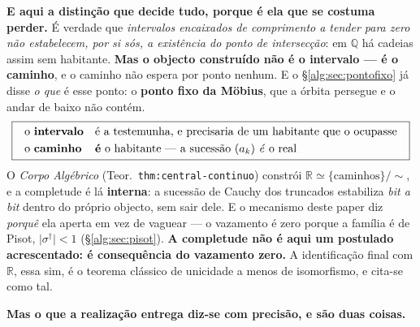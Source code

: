 \documentclass[11pt,a4paper]{article}
\newcommand{\code}[1]{\texttt{\small #1}}
\newcommand{\dg}{^{\dagger}}
\newcommand{\abs}[1]{\lvert #1\rvert}
\begin{document}
\medskip
\noindent\textbf{E aqui a distinção que decide tudo, porque é ela que se costuma
perder.} É verdade que \emph{intervalos encaixados de comprimento a tender para
zero não estabelecem, por si sós, a existência do ponto de intersecção}: em
$\mathbb{Q}$ há cadeias assim sem habitante. \textbf{Mas o objecto construído não é
o intervalo --- é o caminho}, e o caminho não espera por ponto nenhum. E o
\S\ref{alg:sec:pontofixo} já disse \emph{o que} é esse ponto: o \textbf{ponto fixo da
Möbius}, que a órbita persegue e o andar de baixo não contém.
\[
\boxed{\;\begin{array}{ll}
\text{o \textbf{intervalo}} & \text{é a testemunha, e precisaria de um habitante que
o ocupasse}\\[3pt]
\text{o \textbf{caminho}} & \textbf{é} \text{ o habitante --- a sucessão } (a_k)
\text{ \emph{é} o real}
\end{array}\;}
\]
O \emph{Corpo Algébrico} (Teor.~\code{thm:central-continuo}) constrói
$\mathbb{R}\simeq\{\text{caminhos}\}/\!\sim$, e a completude é lá \textbf{interna}: a
sucessão de Cauchy dos truncados estabiliza \emph{bit a bit} dentro do próprio
objecto, sem sair dele. E o mecanismo deste paper diz \emph{porquê} ela aperta em
vez de vaguear --- o vazamento é zero porque a família é de Pisot,
$\abs{\sigma\dg}<1$ (\S\ref{alg:sec:pisot}). \textbf{A completude não é aqui um
postulado acrescentado: é consequência do vazamento zero.} A identificação final
com $\mathbb{R}$, essa sim, é o teorema clássico de unicidade a menos de
isomorfismo, e cita-se como tal.

\medskip
\noindent\textbf{Mas o que a realização entrega diz-se com precisão, e são duas
coisas.}
\end{document}
